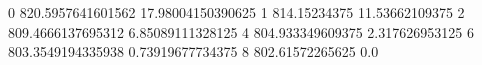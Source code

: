 0 820.5957641601562 17.98004150390625
1 814.15234375 11.53662109375
2 809.4666137695312 6.85089111328125
4 804.933349609375 2.317626953125
6 803.3549194335938 0.73919677734375
8 802.61572265625 0.0
